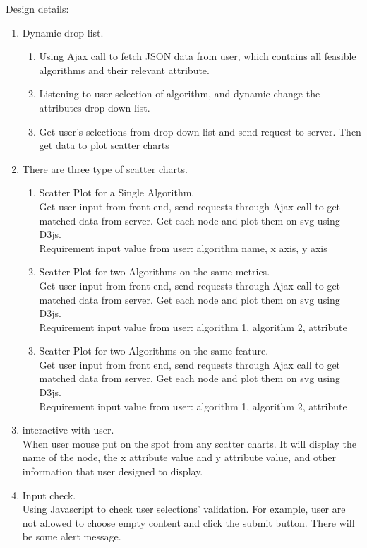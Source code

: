 \documentclass[11pt,letter]{article}
\begin{document}
Design details:
\begin{enumerate}
\item Dynamic drop list.
\begin{enumerate}
\item Using Ajax call to fetch JSON data from user, which contains all feasible algorithms and their relevant attribute.
\item Listening to user selection of algorithm, and dynamic change the attributes drop down list.
\item Get user's selections from drop down list and send request to server. Then get data to plot scatter charts
\end{enumerate}

\item There are three type of scatter charts.

\begin{enumerate}
\item Scatter Plot for a Single Algorithm. \\
Get user input from front end, send requests through Ajax call to get matched data from server. Get each node and plot them on svg using D3js.\\
Requirement input value from user: {algorithm name, x axis, y axis}
\item Scatter Plot for two Algorithms on the same metrics. \\
Get user input from front end, send requests through Ajax call to get matched data from server. Get each node and plot them on svg using D3js.\\
Requirement input value from user: {algorithm 1, algorithm 2, attribute}
\item Scatter Plot for two Algorithms on the same feature. \\
Get user input from front end, send requests through Ajax call to get matched data from server. Get each node and plot them on svg using D3js.\\
Requirement input value from user: {algorithm 1, algorithm 2, attribute}
\end{enumerate}

\item interactive with user. \\
When user mouse put on the spot from any scatter charts. It will display the name of the node, the x attribute value and y attribute value, and other information that user designed to display.

\item Input check.\\
Using Javascript to check user selections' validation. For example, user are not allowed to choose empty content and click the submit button. There will be some alert message.\\

\end{enumerate}
\end{document}
